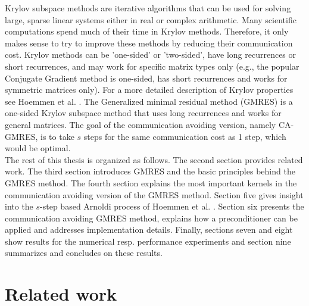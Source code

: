 \documentclass{scrartcl}
\numberwithin{equation}{section}
\begin{document}
Krylov subspace methods are iterative algorithms that can be used for solving large, sparse linear systems either in real or complex arithmetic. Many scientific computations spend much of their time in Krylov methods. Therefore, it only makes sense to try to improve these methods by reducing their communication cost. Krylov methods can be 'one-sided' or 'two-sided', have long recurrences or short recurrences, and may work for specific matrix types only (e.g., the popular Conjugate Gradient method is one-sided, has short recurrences and works for symmetric matrices only). For a more detailed description of Krylov properties see Hoemmen et al. \cite{Hoemmen:2010:CKS:1970638}. The Generalized minimal residual method (GMRES) is a one-sided Krylov subspace method that uses long recurrences and works for general matrices. The goal of the communication avoiding version, namely CA-GMRES, is to take $s$ steps for the same communication cost as 1 step, which would be optimal.\\

The rest of this thesis is organized as follows. The second section provides related work. The third section introduces GMRES and the basic principles behind the GMRES method. The fourth section explains the most important kernels in the communication avoiding version of the GMRES method. Section five gives insight into the $s$-step based Arnoldi process of Hoemmen et al. \cite{Hoemmen:2010:CKS:1970638}. Section six presents the communication avoiding GMRES method, explains how a preconditioner can be applied and addresses implementation details. Finally, sections seven and eight show results for the numerical resp. performance experiments and section nine summarizes and concludes on these results.
 
\section{Related work}

\pagebreak
\end{document}

